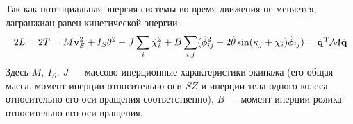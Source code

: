 Так как потенциальная энергия системы во время движения не меняется, лагранжиан  равен кинетической энергии:
\begin{equation}\label{kin_en}
    2L = 2T = M\boldsymbol{\mathbf{v}}_S^2 + I_S\dot{\theta}^2 + J\sum_i\dot{\chi}_i^2 + B\sum_{i,j}(\dot{\phi}_{ij}^2 + 2\dot{\theta}\sin(\kappa_j + \chi_i)\dot{\phi}_{ij})=\dot{\boldsymbol{\mathbf{q}}}^\mathrm{T}\mathcal{M}\dot{\boldsymbol{\mathbf{q}}}
\end{equation}
Здесь $M,\ I_S,\ J$ --- массово-инерционные характеристики экипажа (его общая масса, момент инерции относительно оси $SZ$ и инерции тела одного колеса относительно его оси вращения соответственно), $B$ --- момент инерции ролика относительно его оси вращения.


